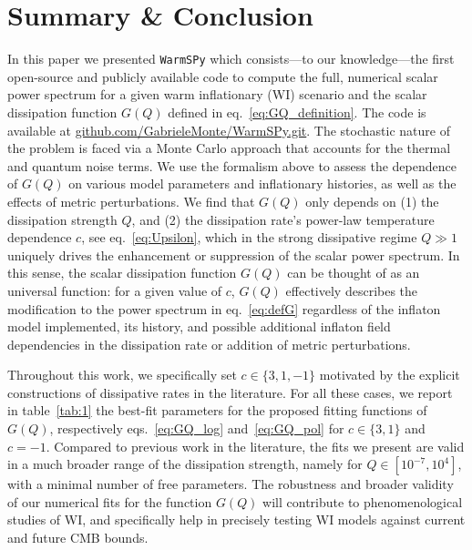 \documentclass[a4paper,11pt]{article}
\begin{document}
\section{Summary \& Conclusion}

In this paper we presented \texttt{WarmSPy} which consists—to our knowledge—the first open-source and publicly available code to compute the full, numerical scalar power spectrum for a given warm inflationary (WI) scenario and the scalar dissipation function $G(Q)$ defined in eq.~\eqref{eq:GQ_definition}.
The code is available at \href{https://github.com/GabrieleMonte/WarmSPy.git}{github.com/GabrieleMonte/WarmSPy.git}. The stochastic nature of the problem is faced via a Monte Carlo approach that accounts for the thermal and quantum noise terms. We use the formalism above to assess the dependence of $G(Q)$ on various model parameters and inflationary histories, as well as the effects of metric perturbations. We find that $G(Q)$ only depends on (1) the dissipation strength $Q$, and (2) the dissipation rate's power-law temperature dependence $c$, see eq.~\eqref{eq:Upsilon}, which in the strong dissipative regime $Q\gg 1$ uniquely drives the enhancement or suppression of the scalar power spectrum. In this sense, the scalar dissipation function $G(Q)$ can be thought of as an universal function: for a given value of $c$, $G(Q)$ effectively describes the modification to the power spectrum in eq.~\eqref{eq:defG} regardless of the inflaton model implemented, its history, and possible additional inflaton field dependencies in the dissipation rate or addition of metric perturbations.

Throughout this work, we specifically set $c\in\{3,1,-1\}$ motivated by the explicit constructions of dissipative rates in the literature. For all these cases, we report in table~\ref{tab:1} the best-fit parameters for the proposed fitting functions of $G(Q)$, respectively eqs.~\eqref{eq:GQ_log} and~\eqref{eq:GQ_pol} for $c\in\{3,1\}$ and $c=-1$. Compared to previous work in the literature, the fits we present are valid in a much broader range of the dissipation strength, namely for $Q\in[10^{-7},10^{4}]$, with a minimal number of free parameters. The robustness and broader validity of our numerical fits for the function $G(Q)$ will contribute to phenomenological studies of WI, and specifically help in precisely testing WI models against current and future CMB bounds.
\end{document}

